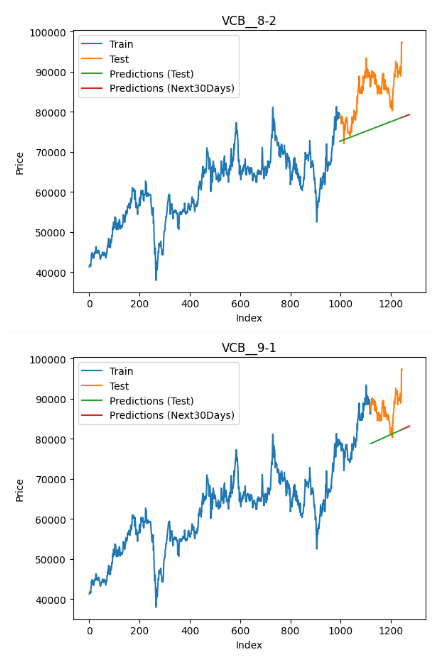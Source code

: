 \begin{figure}[H]
\begin{minipage}{0.15\textwidth}
    \includegraphics[width=1\textwidth]{resources/chapter-5/result/VCB_LinearRegression_8-2.png}
    \end{minipage}
    \hfill
        \begin{minipage}{0.15\textwidth}
    \centering
    \includegraphics[width=1\textwidth]{resources/chapter-5/result/VCB_LinearRegression_9-1.png}
    \end{minipage}
    \hfill
    \begin{minipage}{0.15\textwidth}
    \centering

\end{minipage}
\end{figure}
